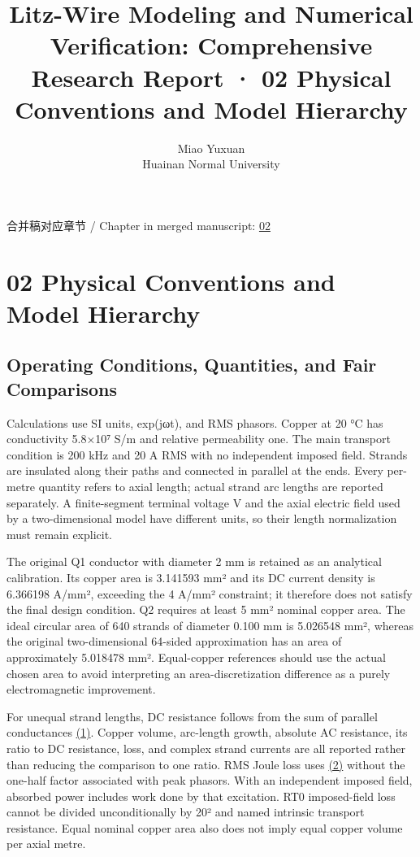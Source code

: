 \documentclass[11pt]{article}
\begin{document}
\title{Litz-Wire Modeling and Numerical Verification: Comprehensive Research Report · 02 Physical Conventions and Model Hierarchy}
\author{Miao Yuxuan\\Huainan Normal University}
\date{}
\maketitle
\noindent 合并稿对应章节 / Chapter in merged manuscript: \href{report_en_single.pdf#chapter-02}{02}\par
\FloatBarrier
\section*{02 Physical Conventions and Model Hierarchy}
\hypertarget{chapter-02}{}
\subsection*{Operating Conditions, Quantities, and Fair Comparisons}
\hypertarget{02.conventions.heading}{}
Calculations use SI units, exp(jωt), and RMS phasors. Copper at 20 °C has conductivity 5.8×10⁷ S/m and relative permeability one. The main transport condition is 200 kHz and 20 A RMS with no independent imposed field. Strands are insulated along their paths and connected in parallel at the ends. Every per-metre quantity refers to axial length; actual strand arc lengths are reported separately. A finite-segment terminal voltage V and the axial electric field used by a two-dimensional model have different units, so their length normalization must remain explicit.


The original Q1 conductor with diameter 2 mm is retained as an analytical calibration. Its copper area is 3.141593 mm² and its DC current density is 6.366198 A/mm², exceeding the 4 A/mm² constraint; it therefore does not satisfy the final design condition. Q2 requires at least 5 mm² nominal copper area. The ideal circular area of 640 strands of diameter 0.100 mm is 5.026548 mm², whereas the original two-dimensional 64-sided approximation has an area of approximately 5.018478 mm². Equal-copper references should use the actual chosen area to avoid interpreting an area-discretization difference as a purely electromagnetic improvement.


For unequal strand lengths, DC resistance follows from the sum of parallel conductances \href{report_en_single.pdf#E01}{(1)}. Copper volume, arc-length growth, absolute AC resistance, its ratio to DC resistance, loss, and complex strand currents are all reported rather than reducing the comparison to one ratio. RMS Joule loss uses \href{report_en_single.pdf#E02}{(2)} without the one-half factor associated with peak phasors. With an independent imposed field, absorbed power includes work done by that excitation. RT0 imposed-field loss cannot be divided unconditionally by 20² and named intrinsic transport resistance. Equal nominal copper area also does not imply equal copper volume per axial metre.
\end{document}
